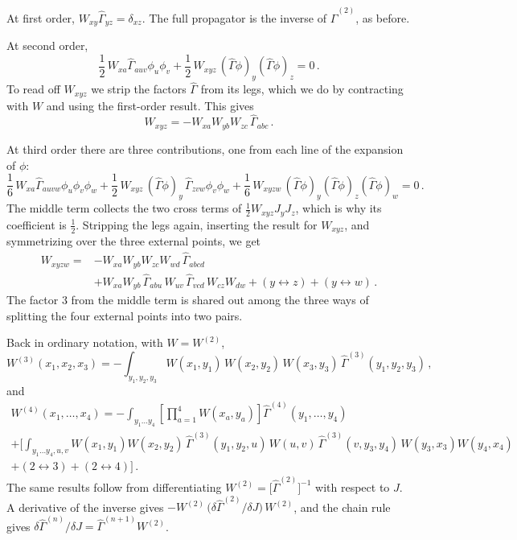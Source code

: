 At first order, $W_{xy}\hat\Gamma_{yz}=\delta_{xz}$. The full propagator is
the inverse of $\hat\Gamma^{(2)}$, as before.

At second order,
\[
\frac12\,W_{xa}\hat\Gamma_{auv}\phi_u\phi_v+\frac12\,W_{xyz}\,(\hat\Gamma\phi)_y(\hat\Gamma\phi)_z=0\,.
\]
To read off $W_{xyz}$ we strip the factors $\hat\Gamma$ from its legs, which we
do by contracting with $W$ and using the first-order result. This gives
\[
W_{xyz}=-W_{xa}W_{yb}W_{zc}\,\hat\Gamma_{abc}\,.
\]

At third order there are three contributions, one from each line of the
expansion of $\phi$:
\[
\frac16\,W_{xa}\hat\Gamma_{auvw}\phi_u\phi_v\phi_w
+\frac12\,W_{xyz}\,(\hat\Gamma\phi)_y\,\hat\Gamma_{zvw}\phi_v\phi_w
+\frac16\,W_{xyzw}\,(\hat\Gamma\phi)_y(\hat\Gamma\phi)_z(\hat\Gamma\phi)_w=0\,.
\]
The middle term collects the two cross terms of $\frac12W_{xyz}J_yJ_z$, which is
why its coefficient is $\frac12$. Stripping the legs again, inserting the
result for $W_{xyz}$, and symmetrizing over the three external points, we get
\begin{align*}
W_{xyzw}={}&-W_{xa}W_{yb}W_{zc}W_{wd}\,\hat\Gamma_{abcd}\\
&+W_{xa}W_{yb}\,\hat\Gamma_{abu}\,W_{uv}\,\hat\Gamma_{vcd}\,W_{cz}W_{dw}
+(y\leftrightarrow z)+(y\leftrightarrow w)\,.
\end{align*}
The factor $3$ from the middle term is shared out among the three ways of
splitting the four external points into two pairs.

 Back in ordinary notation, with $W=W^{(2)}$,
\[
W^{(3)}(x_1,x_2,x_3)=-\int_{y_1,y_2,y_3}W(x_1,y_1)\,W(x_2,y_2)\,W(x_3,y_3)\,\hat\Gamma^{(3)}(y_1,y_2,y_3)\,,
\]
and
\begin{multline*}
W^{(4)}(x_1,\dots,x_4)=-\int_{y_1\dots y_4}\left[\prod_{a=1}^4W(x_a,y_a)\right]\hat\Gamma^{(4)}(y_1,\dots,y_4)\\
+\biggl[\int_{y_1\dots y_4,u,v}W(x_1,y_1)W(x_2,y_2)\,\hat\Gamma^{(3)}(y_1,y_2,u)\,W(u,v)\,\hat\Gamma^{(3)}(v,y_3,y_4)\,W(y_3,x_3)W(y_4,x_4)\\
+(2\leftrightarrow3)+(2\leftrightarrow4)\biggr]\,.
\end{multline*}
The same results follow from differentiating $W^{(2)}=\bigl[\hat\Gamma^{(2)}\bigr]^{-1}$
with respect to $J$. A derivative of the inverse gives
$-W^{(2)}\,\bigl(\delta\hat\Gamma^{(2)}/\delta J\bigr)\,W^{(2)}$, and the chain rule gives
$\delta\hat\Gamma^{(n)}/\delta J=\hat\Gamma^{(n+1)}W^{(2)}$.


